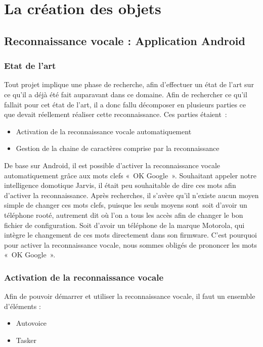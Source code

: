 \chapter{La création des objets}

\section{Reconnaissance vocale : Application Android}
	\subsection{Etat de l’art}
	
	Tout projet implique une phase de recherche, afin d'effectuer un état de l'art sur ce qu'il a déjà été fait auparavant dans ce domaine.
Afin de rechercher ce qu'il fallait pour cet état de l'art, il a donc fallu décomposer en plusieurs parties ce que devait réellement réaliser cette reconnaissance. Ces parties étaient :
\begin{itemize}
\item Activation de la reconnaissance vocale automatiquement
\item Gestion de la chaine de caractères comprise par la reconnaissance
\end{itemize}

De base sur Android, il est possible d'activer la reconnaissance vocale automatiquement grâce aux mots clefs « OK Google ». Souhaitant appeler notre intelligence domotique Jarvis, il était peu souhaitable de dire ces mots afin d'activer la reconnaissance.
Après recherches, il s'avère qu'il n'existe aucun moyen simple de changer ces mots clefs, puisque les seuls moyens sont soit d'avoir un téléphone rooté, autrement dit où l'on a tous les accès afin de changer le bon fichier de configuration. Soit d'avoir un téléphone de la marque Motorola, qui intègre le changement de ces mots directement dans son firmware. C'est pourquoi pour activer la reconnaissance vocale, nous sommes obligés de prononcer les mots « OK Google ».
	
	\subsection{Activation de la reconnaissance vocale}
	
Afin de pouvoir démarrer et utiliser la reconnaissance vocale, il faut un ensemble d'éléments :
\begin{itemize}
 \item Autovoice
 \item Tasker
\end{itemize}

